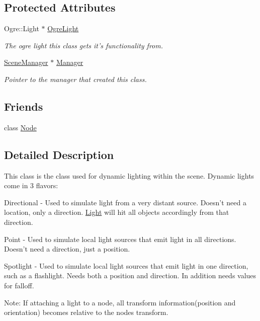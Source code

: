 \subsection*{Protected Attributes}
\begin{DoxyCompactItemize}
\item 
\hypertarget{classphys_1_1Light_a20fc9136847907955cfb8c1a47d6ec6a}{
Ogre::Light $\ast$ \hyperlink{classphys_1_1Light_a20fc9136847907955cfb8c1a47d6ec6a}{OgreLight}}
\label{dc/df1/classphys_1_1Light_a20fc9136847907955cfb8c1a47d6ec6a}

\begin{DoxyCompactList}\small\item\em The ogre light this class gets it's functionality from. \item\end{DoxyCompactList}\item 
\hypertarget{classphys_1_1Light_a2633fc1795d2a3e2ddddc71674a7eb84}{
\hyperlink{classphys_1_1SceneManager}{SceneManager} $\ast$ \hyperlink{classphys_1_1Light_a2633fc1795d2a3e2ddddc71674a7eb84}{Manager}}
\label{dc/df1/classphys_1_1Light_a2633fc1795d2a3e2ddddc71674a7eb84}

\begin{DoxyCompactList}\small\item\em Pointer to the manager that created this class. \item\end{DoxyCompactList}\end{DoxyCompactItemize}
\subsection*{Friends}
\begin{DoxyCompactItemize}
\item 
class \hyperlink{classphys_1_1Light_a6db9d28bd448a131448276ee03de1e6d}{Node}
\end{DoxyCompactItemize}


\subsection{Detailed Description}
This class is the class used for dynamic lighting within the scene. Dynamic lights come in 3 flavors: \par
 Directional -\/ Used to simulate light from a very distant source. Doesn't need a location, only a direction. \hyperlink{classphys_1_1Light}{Light} will hit all objects accordingly from that direction. \par
 Point -\/ Used to simulate local light sources that emit light in all directions. Doesn't need a direction, just a position. \par
 Spotlight -\/ Used to simulate local light sources that emit light in one direction, such as a flashlight. Needs both a position and direction. In addition needs values for falloff. \par
 Note: If attaching a light to a node, all transform information(position and orientation) becomes relative to the nodes transform. 

